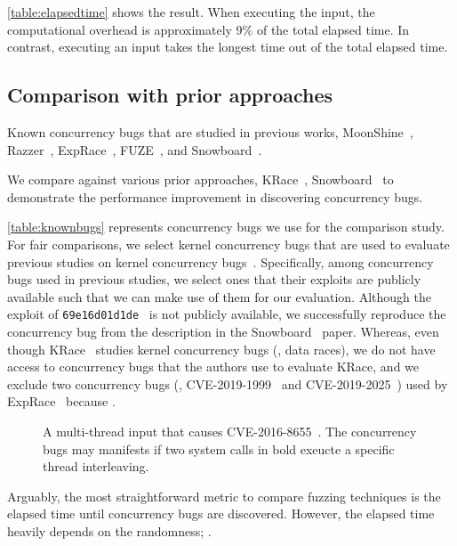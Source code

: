 \autoref{table:elapsedtime} shows the result. When executing the
input, the computational overhead is approximately 9\% of the total
elapsed time. In contrast, executing an input takes the longest time
out of the total elapsed time.
\dr{}



\subsection{Comparison with prior approaches}
\label{ss:comparison}

\begin{table}[t]
  
  \centering
  \caption{Known concurrency bugs that are studied in previous works,
    MoonShine~\cite{moonshine}, Razzer~\cite{razzer},
    ExpRace~\cite{exprace}, FUZE~\cite{fuze}, and
    Snowboard~\cite{snowboard}.}
  \label{table:knownbugs}
\end{table}

We compare \sys against various prior approaches, KRace~\cite{krace},
Snowboard~\cite{snowboard} to demonstrate the performance improvement
in discovering concurrency bugs.

%
\autoref{table:knownbugs} represents concurrency bugs we use for the
comparison study.
%
For fair comparisons, we select kernel concurrency bugs that are used
to evaluate previous studies on kernel concurrency bugs~\cite{exprace,
  razzer, snowboard, krace, moonshine, fuze}.
%
Specifically, among concurrency bugs used in previous studies, we
select ones that their exploits are publicly available such that we
can make use of them for our evaluation.
%
Although the exploit of \texttt{69e16d01d1de}~\cite{snowboardbug} is
not publicly available, we successfully reproduce the concurrency bug
from the description in the Snowboard~\cite{snowboard} paper.
%
Whereas, even though KRace~\cite{krace} studies kernel concurrency
bugs (\ie, data races), we do not have access to concurrency bugs that
the authors use to evaluate KRace, and we exclude two concurrency bugs
(\ie, CVE-2019-1999~\cite{cve20191999} and
CVE-2019-2025~\cite{cve20192025}) used by ExpRace~\cite{exprace}
because .

%
\begin{figure}[t]
  \caption{A multi-thread input that causes
    CVE-2016-8655~\cite{cve20168655}. The concurrency bugs may
    manifests if two system calls in bold exeucte a specific thread
    interleaving.}
  \label{fig:multithreadinput}
\end{figure}
%
Arguably, the most straightforward metric to compare fuzzing
techniques is the elapsed time until concurrency bugs are discovered.
%
However, the elapsed time heavily depends on the randomness;
.


